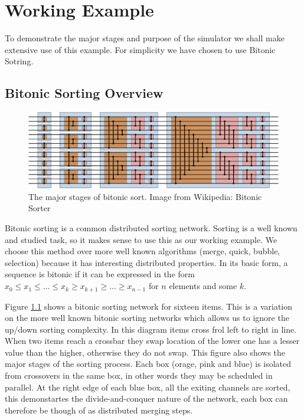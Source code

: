 \chapter{Working Example}

To demonstrate the major stages and purpose of the simulator we shall make extensive use of this example.
For simplicity we have chosen to use Bitonic Sotring.

\section{Bitonic Sorting Overview}

\begin{figure}
\begin{center}
	\includegraphics[width=12cm]{figures/egBitonicSort.eps}
\caption{The major stages of bitonic sort.  Image from Wikipedia: Bitonic Sorter}
\label{figBitonicNormal}
\end{center}
\end{figure}

Bitonic sorting is a common distributed sorting network.
Sorting is a well known and studied task, so it makes sense to use this as our working example.
We choose this method over more well known algorithms (merge, quick, bubble, selection) because it has interesting distributed properties.
In its basic form, a sequence is bitonic if it can be expressed in the form $x_0 \leq x_1 \leq ... \leq x_k \geq x_{k+1} \geq ... \geq x_{n-1}$ for $n$ elements and some $k$.

Figure \ref{figBitonicNormal} shows a bitonic sorting network for sixteen items.
This is a variation on the more well known bitonic sorting networks which allows us to ignore the up/down sorting complexity.
In this diagram items cross frol left to right in line.
When two items reach a crossbar they swap location of the lower one has a lesser value than the higher, otherwise they do not swap.
This figure also shows the major stages of the sorting process.
Each box (orage, pink and blue) is isolated from crossovers in the same box, in other words they may be scheduled in parallel.
At the right edge of each blue box, all the exiting channels are sorted, this demonstartes the divide-and-conquer nature of the network, each box can therefore be though of as distributed merging steps.

